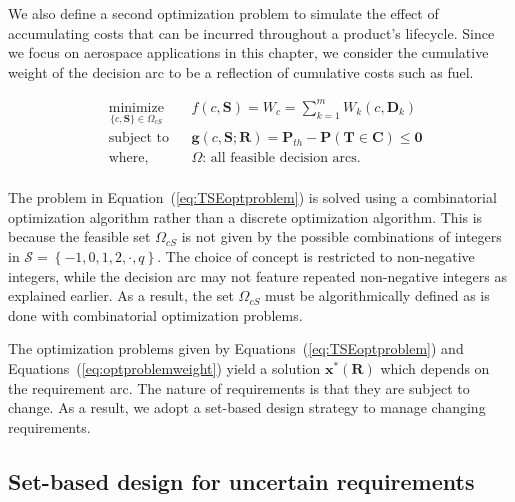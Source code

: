 We also define a second optimization problem to simulate the effect of accumulating costs that can be incurred throughout a product's lifecycle. Since we focus on aerospace applications in this chapter, we consider the cumulative weight of the decision arc to be a reflection of cumulative costs such as fuel.

\begin{equation}
	\label{eq:optproblemweight}
	\begin{aligned}
		& \underset{\{c,\mathbf{S}\}\in\Omega_{cS}}{\text{minimize}}
		& & {f}(c,\mathbf{S}) = W_c = \sum\limits_{k=1}^{m} W_{k}(c,\mathbf{D}_k)\\
		& \text{subject to}
		& & \mathbf{g}(c,\mathbf{S};\mathbf{R}) = \mathbf{P}_{th} - \mathbf{P}(\mathbf{T} \in \mathbf{C}) \le \mathbf{0}\\
		& \text{where,}
		& & \Omega\text{: all feasible decision arcs}.\\
	\end{aligned}
\end{equation}

The problem in Equation~(\ref{eq:TSEoptproblem}) is solved using a combinatorial optimization algorithm rather than a discrete optimization algorithm. This is because the feasible set $\Omega_{cS}$ is not given by the possible combinations of integers in $\mathcal{S} = \left\{-1,0,1,2,\cdot,q\right\}$. The choice of concept is restricted to non-negative integers, while the decision arc may not feature repeated non-negative integers as explained earlier. As a result, the set $\Omega_{cS}$ must be algorithmically defined as is done with combinatorial optimization problems.

The optimization problems given by Equations~(\ref{eq:TSEoptproblem}) and Equations~(\ref{eq:optproblemweight}) yield a solution $\mathbf{x}^*(\mathbf{R})$ which depends on the requirement arc. The nature of requirements is that they are subject to change. As a result, we adopt a set-based design strategy to manage changing requirements.

\subsection{Set-based design for uncertain requirements} \label{subsec:SBDproblem}


